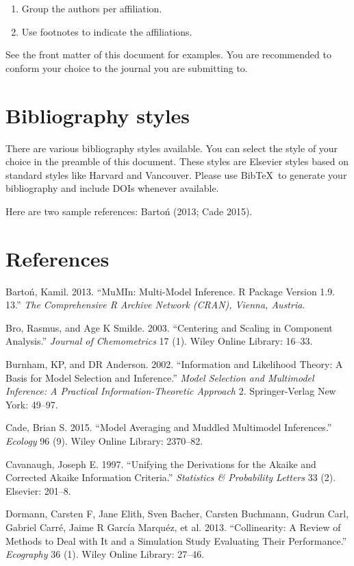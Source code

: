 \documentclass[]{elsarticle} %
\begin{document}
\begin{enumerate}
\def\labelenumi{(\arabic{enumi})}
\item
  Group the authors per affiliation.
\item
  Use footnotes to indicate the affiliations.
\end{enumerate}

See the front matter of this document for examples. You are recommended
to conform your choice to the journal you are submitting to.

\section{Bibliography styles}\label{bibliography-styles}

There are various bibliography styles available. You can select the
style of your choice in the preamble of this document. These styles are
Elsevier styles based on standard styles like Harvard and Vancouver.
Please use BibTeX~to generate your bibliography and include DOIs
whenever available.

Here are two sample references: Barto{ń} (2013; Cade 2015).

\section*{References}\label{references}

Barto{ń}, Kamil. 2013. ``MuMIn: Multi-Model Inference. R Package Version
1.9. 13.'' \emph{The Comprehensive R Archive Network (CRAN), Vienna,
Austria}.

Bro, Rasmus, and Age K Smilde. 2003. ``Centering and Scaling in
Component Analysis.'' \emph{Journal of Chemometrics} 17 (1). Wiley
Online Library: 16--33.

Burnham, KP, and DR Anderson. 2002. ``Information and Likelihood Theory:
A Basis for Model Selection and Inference.'' \emph{Model Selection and
Multimodel Inference: A Practical Information-Theoretic Approach} 2.
Springer-Verlag New York: 49--97.

Cade, Brian S. 2015. ``Model Averaging and Muddled Multimodel
Inferences.'' \emph{Ecology} 96 (9). Wiley Online Library: 2370--82.

Cavanaugh, Joseph E. 1997. ``Unifying the Derivations for the Akaike and
Corrected Akaike Information Criteria.'' \emph{Statistics \& Probability
Letters} 33 (2). Elsevier: 201--8.

Dormann, Carsten F, Jane Elith, Sven Bacher, Carsten Buchmann, Gudrun
Carl, Gabriel Carr{é}, Jaime R Garc{í}a Marqu{é}z, et al. 2013.
``Collinearity: A Review of Methods to Deal with It and a Simulation
Study Evaluating Their Performance.'' \emph{Ecography} 36 (1). Wiley
Online Library: 27--46.
\end{document}
